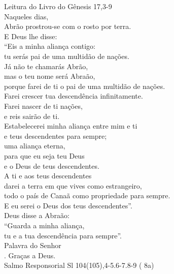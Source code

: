\documentclass{book}
\begin{document}
\begin{flushleft}
    Leitura do Livro do Gênesis
    \hspace{\fill}
    \textcolor{VioletRed2}{17,3-9}
    \vspace{.2cm} \\
    Naqueles dias, \\
    Abrão prostrou-se com o rosto por terra. \\
    E Deus lhe disse: \\
    ``Eis a minha aliança contigo: \\
    tu serás pai de uma multidão de nações. \\
    Já não te chamarás Abrão, \\
    mas o teu nome será Abraão, \\
    porque farei de ti o pai de uma multidão de nações. \\
    Farei crescer tua descendência infinitamente. \\
    Farei nascer de ti nações, \\
    e reis sairão de ti. \\
    Estabelecerei minha aliança entre mim e ti \\
    e teus descendentes para sempre; \\
    uma aliança eterna, \\
    para que eu seja teu Deus \\
    e o Deus de teus descendentes. \\
    A ti e aos teus descendentes \\
    darei a terra em que vives como estrangeiro, \\
    todo o país de Canaã como propriedade para sempre. \\
    E eu serei o Deus dos teus descendentes''. \\
    Deus disse a Abraão: \\
    ``Guarda a minha aliança, \\
    tu e a tua descendência para sempre''.
    \vspace{.2cm} \\
    Palavra do Senhor \\
    {\color{VioletRed2} \Rbar.} Graças a Deus.
    \vspace{.2cm} \\
    \textcolor{VioletRed2}{Salmo Responsorial
        \hspace{\fill} Sl 104(105),4-5.6-7.8-9 (\RbarRed{} 8a)}
    \vspace{.2cm} \\

\end{flushleft}
\end{document}
